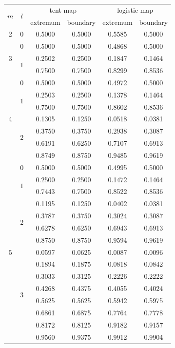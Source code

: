 \documentclass{beamer}
\begin{document}
	\begin{frame}
		\scriptsize \centering
		\begin{tabular}{cccccc}
			\multirow{2}{*}{$m$}
			&\multirow{2}{*}{$l$}
			&\multicolumn{2}{c}{tent map}
			&\multicolumn{2}{c}{logistic map}\\ \cline{3-6}
			&&\textrm{extremum}&\textrm{boundary}&\textrm{extremum}&\textrm{boundary}\\
			\hline
			\multirow{1}{*}{$2$}& \multirow{1}{*}{$0$} & 0.5000 & 0.5000 & 0.5585 & 0.5000\\
			\hline
			\multirow{3}{*}{$3$}& \multirow{1}{*}{$0$} & 0.5000 & 0.5000 & 0.4868 & 0.5000\\ \cline{2-6}
			& \multirow{2}{*}{$1$} & 0.2502 & 0.2500 & 0.1847 & 0.1464\\
			& & 0.7500 & 0.7500 & 0.8299 & 0.8536\\
			\hline
			\multirow{7}{*}{$4$}& \multirow{1}{*}{$0$} & 0.5000 & 0.5000 & 0.4972 & 0.5000\\ \cline{2-6}
			& \multirow{2}{*}{$1$} & 0.2503 & 0.2500 & 0.1378 & 0.1464\\
			& & 0.7500 & 0.7500 & 0.8602 & 0.8536\\ \cline{2-6}
			& \multirow{4}{*}{$2$} & 0.1305 & 0.1250 & 0.0518 & 0.0381\\
			& & 0.3750 & 0.3750 & 0.2938 & 0.3087\\
			& & 0.6191 & 0.6250 & 0.7107 & 0.6913\\
			& & 0.8749 & 0.8750 & 0.9485 & 0.9619\\
			\hline
			\multirow{15}{*}{$5$}& \multirow{1}{*}{$0$} & 0.5000 & 0.5000 & 0.4995 & 0.5000\\ \cline{2-6}
			& \multirow{2}{*}{$1$} & 0.2500 & 0.2500 & 0.1472 & 0.1464\\
			& & 0.7443 & 0.7500 & 0.8522& 0.8536\\ \cline{2-6}
			& \multirow{4}{*}{$2$} & 0.1195 & 0.1250 & 0.0402 & 0.0381\\
			& & 0.3787 & 0.3750 & 0.3024 & 0.3087\\
			& & 0.6278 & 0.6250 & 0.6943 & 0.6913\\
			& & 0.8750 & 0.8750 & 0.9594 & 0.9619\\ \cline{2-6}
			& \multirow{8}{*}{$3$} & 0.0597 & 0.0625 & 0.0087 & 0.0096\\
			& & 0.1894 & 0.1875 & 0.0818 & 0.0842\\
			& & 0.3033 & 0.3125 & 0.2226 & 0.2222\\
			& & 0.4268 & 0.4375 & 0.4055 &0.4024\\
			& & 0.5625 & 0.5625 & 0.5942 & 0.5975\\
			& & 0.6861 & 0.6875 & 0.7764 & 0.7778\\
			& & 0.8172 & 0.8125 & 0.9182 & 0.9157\\
			& & 0.9560 & 0.9375 & 0.9912 & 0.9904\\
			\hline
		\end{tabular}
	\end{frame}
\end{document}
